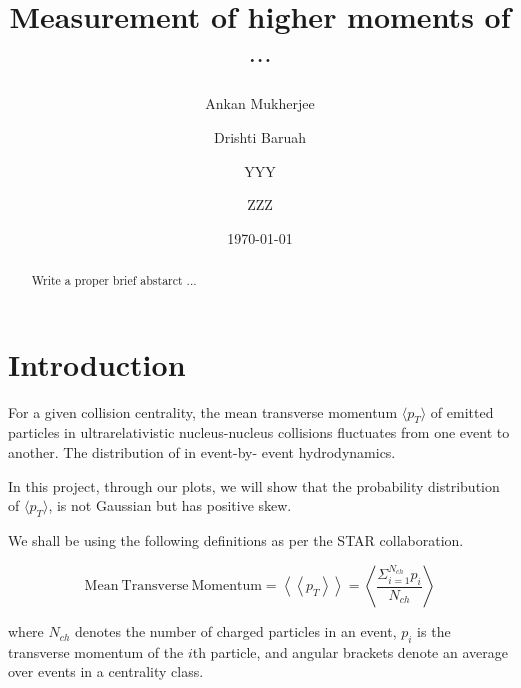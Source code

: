 \documentclass[letterpaper,aps,prc,superscriptaddress,nofootinbib,10pt,showpacs,floatfix]{revtex4-2}%
\newcommand{\bfrac}[2]{\frac{\displaystyle #1}{\displaystyle #2}}
\begin{document}
\title{ Measurement of higher moments of   $\cdots$}
\author{Ankan Mukherjee} 
\author{Drishti Baruah}
\author{YYY}
\author{ZZZ}



\date{\today}  



\begin{abstract}

Write a proper brief abstarct ...
\end{abstract}

\maketitle

\section{Introduction}



For a given collision centrality, the mean transverse momentum $\langle p_T\rangle$ of emitted particles in ultrarelativistic nucleus-nucleus collisions fluctuates from one event to another. The distribution of  in event-by-
event hydrodynamics.
 
In this project, through our plots, we will show that the probability distribution of $\langle p_T\rangle$, is not Gaussian but has positive skew.

We shall be using the following definitions as per the STAR collaboration.

\begin{equation}
\label{eq:1}
\mathrm{Mean\ Transverse\ Momentum}=\left<\left<p_T\right>\right>=\left<\bfrac{\Sigma_{i=1}^{N_{ch}} p_i}{N_{ch}}\right>
\end{equation}

where $N_{ch}$ denotes the number of charged particles in an event, $p_i$ is the transverse momentum of the $i$th particle, and angular brackets denote an average over events in a centrality class.
\end{document}
